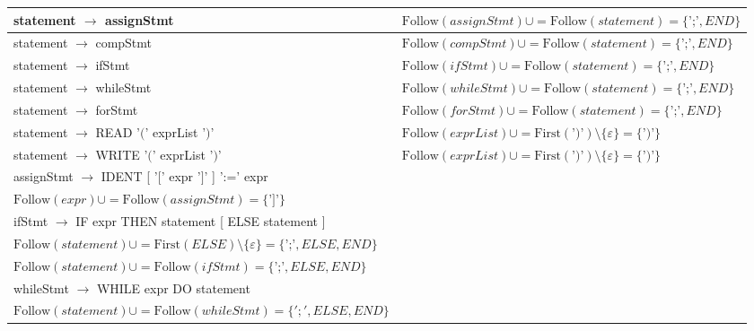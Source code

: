 \documentclass[8pt]{scrartcl}
\newcommand{\First}[1]{\mathrm{First}(#1)}
\newcommand{\Follow}[1]{\mathrm{Follow}(#1)}
\newcommand{\epsset}{\{\varepsilon\}}
\begin{document}
\begin{itemize}
\begin{tabular}{|l|l|}
                    \hline 
                    statement $\rightarrow$ assignStmt & $\Follow{assignStmt} \cup = \Follow{statement} = \{\text{';'}, END\}$\\
                    \hline
                    statement $\rightarrow$ compStmt & $\Follow{compStmt} \cup = \Follow{statement} = \{\text{';'}, END\}$\\
                    \hline
                    statement $\rightarrow$ ifStmt & $\Follow{ifStmt} \cup = \Follow{statement} = \{\text{';'}, END\}$\\
                    \hline
                    statement $\rightarrow$ whileStmt & $\Follow{whileStmt} \cup = \Follow{statement} = \{\text{';'}, END\}$\\
                    \hline
                    statement $\rightarrow$ forStmt & $\Follow{forStmt} \cup = \Follow{statement} = \{\text{';'}, END\}$\\
                    \hline
                    statement $\rightarrow$ READ '$($' exprList '$)$' & $\Follow{exprList} \cup = \First{\text{'$)$'}} \setminus \epsset = \{\text{'$)$'}\}$\\
                    \hline
                    statement $\rightarrow$ WRITE '$($' exprList '$)$' & $\Follow{exprList} \cup = \First{\text{'$)$'}} \setminus \epsset = \{\text{'$)$'}\}$\\
                    \hline
                    assignStmt $\rightarrow$ IDENT [ '$[$' expr '$]$' ] ':=' expr & \makecell[l]{$\Follow{expr} \cup = \First{\text{'$]$'}} \setminus \epsset = \{\text{'$]$'}\}$\\ $\Follow{expr} \cup = \Follow{assignStmt} = \{\text{'$]$'}\}$}\\
                    \hline
                    ifStmt $\rightarrow$ IF expr THEN statement [ ELSE statement ] & \makecell[l]{$\Follow{expr} \cup = \First{THEN} \setminus \epsset = \{\text{'$]$'}, THEN\}$\\ $\Follow{statement} \cup = \First{ELSE} \setminus \epsset = \{\text{';'}, ELSE, END\}$\\ $\Follow{statement} \cup = \Follow{ifStmt} = \{\text{';'}, ELSE, END\}$}\\
                    \hline
                    whileStmt $\rightarrow$ WHILE expr DO statement & \makecell[l]{$\Follow{expr} \cup = \First{DO} = \{\text{']'}, THEN, DO\}$\\ $\Follow{statement} \cup = \Follow{whileStmt} = \{';', ELSE, END\}$}\\
                    \hline

\end{tabular}
\end{itemize}
\end{document}
